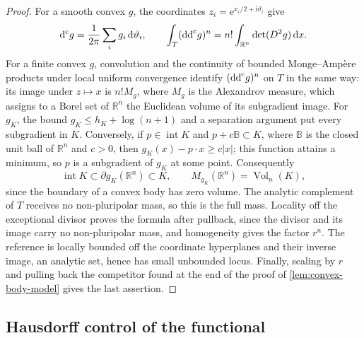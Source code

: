 \begin{proof}
For a smooth convex $g$, the coordinates $z_i=\mathrm{e}^{x_i/2+\mathrm{i}\vartheta_i}$ give
\[
 \mathrm d^{\mathrm c} g=\frac1{2\pi}\sum_i g_i\,\mathrm{d}\vartheta_i,
 \qquad
 \int_T(\mathrm{dd}^{\mathrm{c}} g)^n=n!\int_{\mathbb R^n}\det(D^2g)\,\mathrm{d}x.
\]
For a finite convex $g$, convolution and the continuity of bounded Monge--Amp\`ere products under local uniform convergence identify $(\mathrm{dd}^{\mathrm{c}} g)^n$ on $T$ in the same way: its image under $z\mapsto x$ is $n!M_g$, where $M_g$ is the Alexandrov measure, which assigns to a Borel set of $\mathbb R^n$ the Euclidean volume of its subgradient image. For $g_K$, the bound $g_K\leq h_K+\log(n+1)$ and a separation argument put every subgradient in $K$. Conversely, if $p\in\operatorname{int}K$ and $p+c\mathbb B\subset K$, where $\mathbb B$ is the closed unit ball of $\mathbb R^n$ and $c>0$, then $g_K(x)-p\cdot x\geq c|x|$; this function attains a minimum, so $p$ is a subgradient of $g_K$ at some point. Consequently
\[
 \operatorname{int}K\subset\partial g_K(\mathbb R^n)\subset K,
 \qquad M_{g_K}(\mathbb R^n)=\operatorname{Vol}_n(K),
\]
since the boundary of a convex body has zero volume. The analytic complement of $T$ receives no non-pluripolar mass, so this is the full mass. Locality off the exceptional divisor proves the formula after pullback, since the divisor and its image carry no non-pluripolar mass, and homogeneity gives the factor $r^n$. The reference is locally bounded off the coordinate hyperplanes and their inverse image, an analytic set, hence has small unbounded locus. Finally, scaling by $r$ and pulling back the competitor found at the end of the proof of \cref{lem:convex-body-model} gives the last assertion.
\end{proof}

\subsection{Hausdorff control of the functional}

